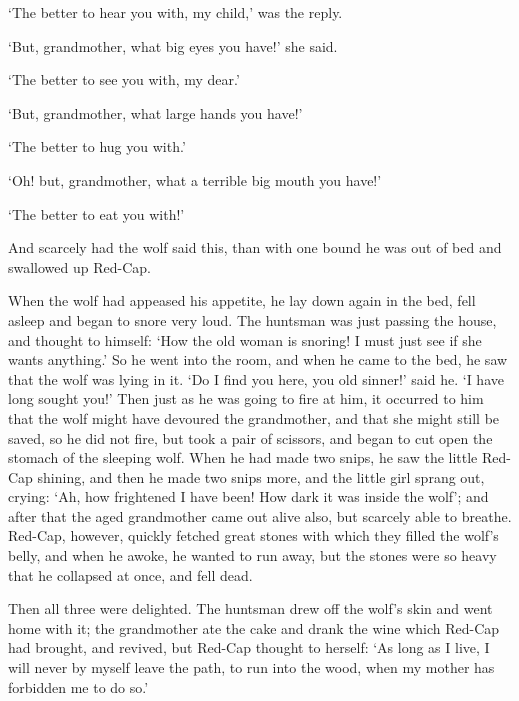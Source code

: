 `The better to hear you with, my child,' was the reply.

`But, grandmother, what big eyes you have!' she said.

`The better to see you with, my dear.'

`But, grandmother, what large hands you have!'

`The better to hug you with.'

`Oh! but, grandmother, what a terrible big mouth you have!'

`The better to eat you with!'

And scarcely had the wolf said this, than with one bound he was out of bed and swallowed up Red-Cap.

When the wolf had appeased his appetite, he lay down again in the bed, fell asleep and began to snore very loud. The huntsman was just passing the house, and thought to himself: `How the old woman is snoring! I must just see if she wants anything.' So he went into the room, and when he
came to the bed, he saw that the wolf was lying in it. `Do I find you here, you old sinner!' said he. `I have long sought you!' Then just as he was going to fire at him, it occurred to him that the wolf might have devoured the grandmother, and that she might still be saved, so he did not fire, but took a pair of scissors, and began to cut open the stomach of the sleeping wolf. When he had made two snips, he saw the little Red-Cap shining, and then he made two snips more, and the little girl sprang out, crying: `Ah, how frightened I have been! How dark it was inside the wolf'; and after that the aged grandmother came out alive also, but scarcely able to breathe. Red-Cap, however, quickly fetched
great stones with which they filled the wolf's belly, and when he awoke, he wanted to run away, but the stones were so heavy that he collapsed at once, and fell dead.

Then all three were delighted. The huntsman drew off the wolf's skin and went home with it; the grandmother ate the cake and drank the wine which Red-Cap had brought, and revived, but Red-Cap thought to herself: `As long as I live, I will never by myself leave the path, to run into the wood, when my mother has forbidden me to do so.'

